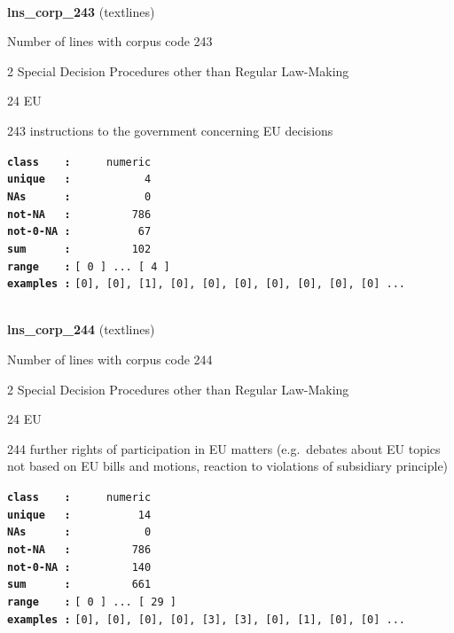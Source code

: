 \documentclass[]{article}
\begin{document}
~

\textbf{lns\_corp\_243} (textlines)

Number of lines with corpus code 243

2 Special Decision Procedures other than Regular Law-Making

24 EU

243 instructions to the government concerning EU decisions

\textbf{\texttt{class\ \ \ \ :}} \texttt{~~~~~numeric}\\
\textbf{\texttt{unique\ \ \ :}} \texttt{~~~~~~~~~~~4}\\
\textbf{\texttt{NAs\ \ \ \ \ \ :}} \texttt{~~~~~~~~~~~0}\\
\textbf{\texttt{not-NA\ \ \ :}} \texttt{~~~~~~~~~786}\\
\textbf{\texttt{not-0-NA\ :}} \texttt{~~~~~~~~~~67}\\
\textbf{\texttt{sum\ \ \ \ \ \ :}} \texttt{~~~~~~~~~102}\\
\textbf{\texttt{range\ \ \ \ :}}
\texttt{{[}\ 0\ {]}\ ...\ {[}\ 4\ {]}}\\
\textbf{\texttt{examples\ :}}
\texttt{{[}0{]},\ {[}0{]},\ {[}1{]},\ {[}0{]},\ {[}0{]},\ {[}0{]},\ {[}0{]},\ {[}0{]},\ {[}0{]},\ {[}0{]}\ ...}\\

~

\textbf{lns\_corp\_244} (textlines)

Number of lines with corpus code 244

2 Special Decision Procedures other than Regular Law-Making

24 EU

244 further rights of participation in EU matters (e.g.~debates about EU
topics not based on EU bills and motions, reaction to violations of
subsidiary principle)

\textbf{\texttt{class\ \ \ \ :}} \texttt{~~~~~numeric}\\
\textbf{\texttt{unique\ \ \ :}} \texttt{~~~~~~~~~~14}\\
\textbf{\texttt{NAs\ \ \ \ \ \ :}} \texttt{~~~~~~~~~~~0}\\
\textbf{\texttt{not-NA\ \ \ :}} \texttt{~~~~~~~~~786}\\
\textbf{\texttt{not-0-NA\ :}} \texttt{~~~~~~~~~140}\\
\textbf{\texttt{sum\ \ \ \ \ \ :}} \texttt{~~~~~~~~~661}\\
\textbf{\texttt{range\ \ \ \ :}}
\texttt{{[}\ 0\ {]}\ ...\ {[}\ 29\ {]}}\\
\textbf{\texttt{examples\ :}}
\texttt{{[}0{]},\ {[}0{]},\ {[}0{]},\ {[}0{]},\ {[}3{]},\ {[}3{]},\ {[}0{]},\ {[}1{]},\ {[}0{]},\ {[}0{]}\ ...}\\
\end{document}
